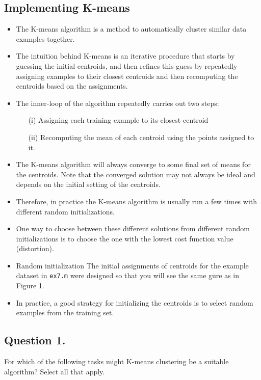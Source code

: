 \documentclass[11pt]{article} %
\begin{document}
\subsection{Implementing K-means}
\begin{itemize}
	\item The K-means algorithm is a method to automatically cluster similar data examples together.
	
	\item The intuition behind K-means is an iterative procedure that starts by guessing the initial centroids, and then refines this guess by repeatedly assigning examples to their closest centroids and then recomputing the centroids based on the assignments.
	
	\item The inner-loop of the algorithm repeatedly carries out two steps: 
	\begin{itemize}
		\item[(i)] Assigning each training example to its closest centroid 
		\item[(ii)] Recomputing the mean of each centroid using the points assigned to it. 
	\end{itemize}
	
	
	\item The K-means algorithm will always converge to some final set of means for the centroids.
	Note that the converged solution may not always be ideal and depends on the initial setting of the centroids. 
	
	\item Therefore, in practice the K-means algorithm is usually run a few times with different random initializations. 
	
	\item One way to choose between these different solutions from different random initializations is to choose the one with the lowest cost function value (distortion).
	
	\item Random initialization
	The initial assignments of centroids for the example dataset in \texttt{ex7.m} were designed so that you will see the same gure as in Figure 1. 
	
	\item In practice, a good strategy for initializing the centroids is to select random examples from the training set.
\end{itemize}
\newpage
\subsection*{Question 1. }
For which of the following tasks might K-means clustering be a suitable algorithm? Select all that apply.
\end{document}

